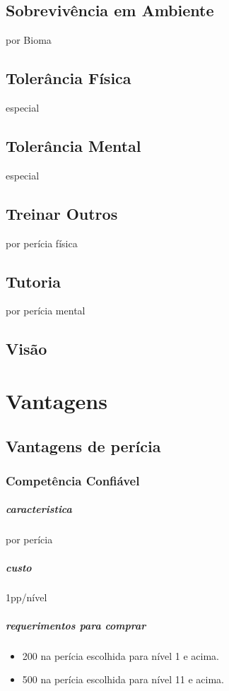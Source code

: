 \section{Sobrevivência em Ambiente} por Bioma
\section{Tolerância Física} especial
\section{Tolerância Mental} especial
\section{Treinar Outros} por perícia física
\section{Tutoria} por perícia mental
\section{Visão}
%
%
%
%
%
\chapter{Vantagens}
%
%
\section{Vantagens de perícia}
%
%
\subsection{Competência Confiável}
\paragraph{caracteristica} por perícia
\paragraph{custo} 1pp/nível
\paragraph{requerimentos para comprar}
\begin{itemize}
  \item 200 na perícia escolhida para nível 1 e acima.
  \item 500 na perícia escolhida para nível 11 e acima.
\end{itemize}
